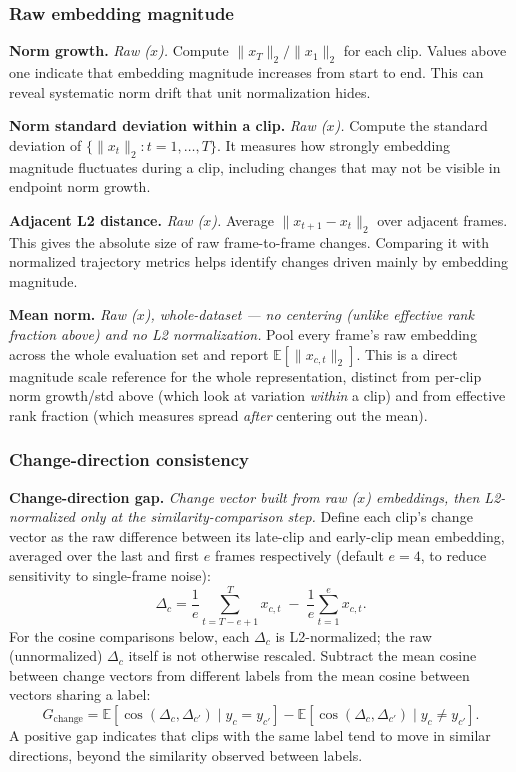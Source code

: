 \subsubsection{Raw embedding magnitude}

\noindent\textbf{Norm growth.} \emph{Raw ($x$).}
Compute $\|x_T\|_2/\|x_1\|_2$ for each clip. Values above one indicate
that embedding magnitude increases from start to end. This can reveal
systematic norm drift that unit normalization hides.

\noindent\textbf{Norm standard deviation within a clip.} \emph{Raw ($x$).}
Compute the standard deviation of
$\{\|x_t\|_2:t=1,\ldots,T\}$. It measures how strongly embedding
magnitude fluctuates during a clip, including changes that may not be
visible in endpoint norm growth.

\noindent\textbf{Adjacent L2 distance.} \emph{Raw ($x$).}
Average $\|x_{t+1}-x_t\|_2$ over adjacent frames. This gives the
absolute size of raw frame-to-frame changes. Comparing it with
normalized trajectory metrics helps identify changes driven mainly by
embedding magnitude.

\noindent\textbf{Mean norm.} \emph{Raw ($x$), whole-dataset --- no centering (unlike
effective rank fraction above) and no L2 normalization.} Pool every frame's raw
embedding across the whole evaluation set and report $\mathbb{E}[\|x_{c,t}\|_2]$. This is
a direct magnitude scale reference for the whole representation, distinct from
per-clip norm growth/std above (which look at variation \emph{within} a clip) and from
effective rank fraction (which measures spread \emph{after} centering out the mean).

\subsubsection{Change-direction consistency}

\noindent\textbf{Change-direction gap.} \emph{Change vector built from raw ($x$)
embeddings, then L2-normalized only at the similarity-comparison step.} Define each
clip's change vector as the raw difference between its late-clip and early-clip mean
embedding, averaged over the last and first $e$ frames respectively (default $e=4$, to
reduce sensitivity to single-frame noise):
\[
    \Delta_c = \frac{1}{e}\sum_{t=T-e+1}^{T} x_{c,t} \;-\; \frac{1}{e}\sum_{t=1}^{e} x_{c,t}.
\]
For the cosine comparisons below, each $\Delta_c$ is L2-normalized; the raw (unnormalized)
$\Delta_c$ itself is not otherwise rescaled. Subtract the mean cosine between change
vectors from different labels from the mean cosine between vectors sharing a label:
\[
    G_{\mathrm{change}}
    =\mathbb{E}[\cos(\Delta_c,\Delta_{c'})\mid y_c=y_{c'}]
    -\mathbb{E}[\cos(\Delta_c,\Delta_{c'})\mid y_c\neq y_{c'}].
\]
A positive gap indicates that clips with the same label tend to move
in similar directions, beyond the similarity observed between labels.
